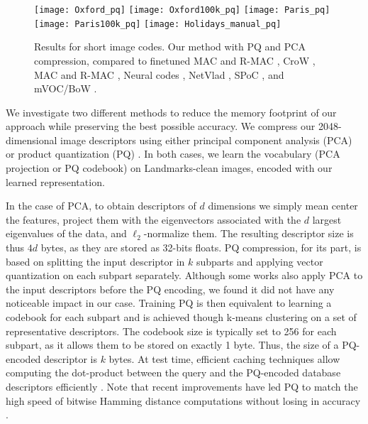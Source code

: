 \documentclass[twocolumn]{svjour3}          \smartqed  \usepackage{graphicx}
\begin{document}
\begin{figure*}[ht!]
  \begin{centering}
    \texttt{[image: Oxford\_pq]}
    \texttt{[image: Oxford100k\_pq]}
    \texttt{[image: Paris\_pq]}
    \texttt{[image: Paris100k\_pq]}
    \texttt{[image: Holidays\_manual\_pq]}
 \par\end{centering}
 \caption{\label{fig:pq}Results for short image codes. Our method with PQ and PCA compression, compared to finetuned MAC and R-MAC \citep{Radenovic2016}, CroW \citep{Kalantidis2016}, MAC and R-MAC \citep{Tolias2016}, Neural codes \citep{Babenko2014}, NetVlad \citep{Arandjelovic2016}, SPoC \citep{Gong2014}, and mVOC/BoW \citep{Radenovic2015}.}
\end{figure*}

We investigate two different methods to reduce the memory footprint of our approach while preserving the best possible accuracy.
We compress our 2048-dimensional image descriptors using either principal component analysis (PCA) or product quantization (PQ) \citep{PQ2011}.
In both cases, we learn the vocabulary (PCA projection or PQ codebook) on Landmarks-clean images, encoded with our learned representation. 

In the case of PCA, to obtain descriptors of $d$ dimensions we simply mean center the features, project them with the eigenvectors associated with the $d$ largest eigenvalues of the data, and $\ell_2$-normalize them. 
The resulting descriptor size is thus $4d$ bytes, as they are stored as 32-bits floats.
PQ compression, for its part, is based on splitting the input descriptor in $k$ subparts and applying vector quantization on each subpart separately.
Although some works also apply PCA to the input descriptors before the PQ encoding, we found it did not have any noticeable impact in our case.
Training PQ is then equivalent to learning a codebook for each subpart and is achieved though k-means clustering on a set of representative descriptors. 
The codebook size is typically set to 256 for each subpart, as it allows them to be stored on exactly 1 byte. Thus, the size of a PQ-encoded descriptor is $k$ bytes.
At test time, efficient caching techniques allow computing the dot-product between the query and the PQ-encoded database descriptors efficiently \citep{PQ2011}. 
Note that recent improvements have led PQ to match the high speed of bitwise Hamming distance computations without losing in accuracy \citep{Douze2016}.
\end{document}
